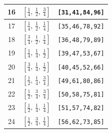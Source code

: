 \documentclass[fleqn,8pt]{jsarticle}
\begin{document}
\begin{longtable}{ccc}
16 & $\left[ \frac{1}{4},\, \frac{1}{2},\, \frac{3}{4} \right]$ & {\tt [31,41,84,96]} \\ \hline
17 & $\left[ \frac{1}{4},\, \frac{1}{2},\, \frac{1}{4} \right]$ & {\tt [35,46,78,92]} \\ \hline
18 & $\left[ \frac{3}{4},\, \frac{1}{2},\, \frac{1}{4} \right]$ & {\tt [36,48,79,89]} \\ \hline
19 & $\left[ \frac{1}{4},\, \frac{1}{4},\, \frac{1}{2} \right]$ & {\tt [39,47,53,67]} \\ \hline
20 & $\left[ \frac{3}{4},\, \frac{1}{4},\, \frac{1}{2} \right]$ & {\tt [40,45,52,66]} \\ \hline
21 & $\left[ \frac{1}{2},\, \frac{1}{4},\, \frac{3}{4} \right]$ & {\tt [49,61,80,86]} \\ \hline
22 & $\left[ \frac{1}{2},\, \frac{3}{4},\, \frac{3}{4} \right]$ & {\tt [50,58,75,81]} \\ \hline
23 & $\left[ \frac{1}{2},\, \frac{1}{4},\, \frac{1}{4} \right]$ & {\tt [51,57,74,82]} \\ \hline
24 & $\left[ \frac{1}{2},\, \frac{3}{4},\, \frac{1}{4} \right]$ & {\tt [56,62,73,85]} \\
\end{longtable}
\renewcommand{\arraystretch}{1.2}
\end{document}
